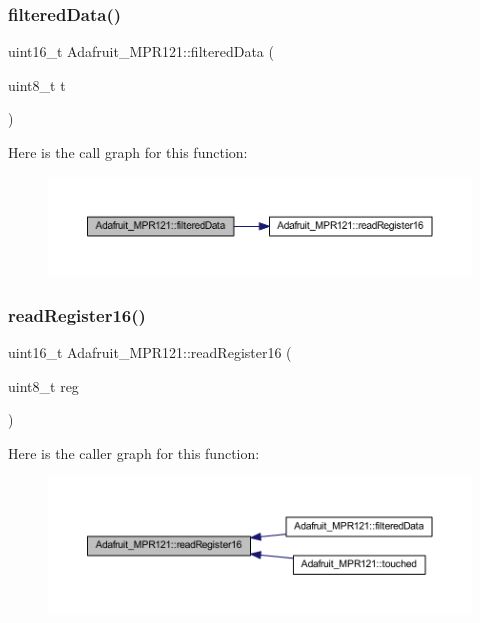 \subsubsection{\texorpdfstring{filtered\+Data()}{filteredData()}}
{\footnotesize\ttfamily uint16\+\_\+t Adafruit\+\_\+\+M\+P\+R121\+::filtered\+Data (\begin{DoxyParamCaption}\item[{uint8\+\_\+t}]{t }\end{DoxyParamCaption})}

Here is the call graph for this function\+:
\nopagebreak
\begin{figure}[H]
\begin{center}
\leavevmode
\includegraphics[width=350pt]{d9/d2e/class_adafruit___m_p_r121_aa5bda4ff04ee361d857b80d95bddbbdb_cgraph}
\end{center}
\end{figure}
\mbox{\label{class_adafruit___m_p_r121_a171bf9f465d96819293657a589450e61}} 
\subsubsection{\texorpdfstring{read\+Register16()}{readRegister16()}}
{\footnotesize\ttfamily uint16\+\_\+t Adafruit\+\_\+\+M\+P\+R121\+::read\+Register16 (\begin{DoxyParamCaption}\item[{uint8\+\_\+t}]{reg }\end{DoxyParamCaption})}

Here is the caller graph for this function\+:
\nopagebreak
\begin{figure}[H]
\begin{center}
\leavevmode
\includegraphics[width=350pt]{d9/d2e/class_adafruit___m_p_r121_a171bf9f465d96819293657a589450e61_icgraph}
\end{center}
\end{figure}
\mbox{\label{class_adafruit___m_p_r121_a344c416d709121094a21d6892e23d28e}} 
